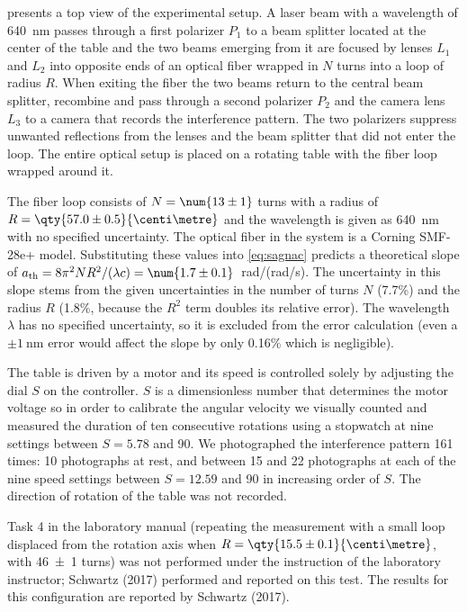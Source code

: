  presents a top view of the experimental setup. A laser beam with a wavelength of \qty{640}{\nano\metre} passes through a first polarizer $P_1$ to a beam splitter located at the center of the table and the two beams emerging from it are focused by lenses $L_1$ and $L_2$ into opposite ends of an optical fiber wrapped in $N$ turns into a loop of radius $R$. When exiting the fiber the two beams return to the central beam splitter, recombine and pass through a second polarizer $P_2$ and the camera lens $L_3$ to a camera that records the interference pattern.
The two polarizers suppress unwanted reflections from the lenses and the beam splitter that did not enter the loop. The entire optical setup is placed on a rotating table with the fiber loop wrapped around it.

The fiber loop consists of $N = \num{13 \pm 1}$ turns with a radius of $R = \qty{57.0 \pm 0.5}{\centi\metre}$ and the wavelength is given as \qty{640}{\nano\metre} with no specified uncertainty. The optical fiber in the system is a Corning SMF-28e+ model. Substituting these values into \cref{eq:sagnac} predicts a theoretical slope of $a_\mathrm{th} = 8\pi^2 N R^2/(\lambda c) = \num{1.7 \pm 0.1}$~rad/(rad/s).
The uncertainty in this slope stems from the given uncertainties in the number of turns $N$ (7.7\%) and the radius $R$ (1.8\%, because the $R^2$ term doubles its relative error). The wavelength $\lambda$ has no specified uncertainty, so it is excluded from the error calculation (even a $\pm\qty{1}{\nano\metre}$ error would affect the slope by only 0.16\% which is negligible).

The table is driven by a motor and its speed is controlled solely by adjusting the dial $S$ on the controller. $S$ is a dimensionless number that determines the motor voltage so in order to calibrate the angular velocity we visually counted and measured the duration of ten consecutive rotations using a stopwatch at nine settings between $S = 5.78$ and 90. We photographed the interference pattern 161 times: 10 photographs at rest, and between 15 and 22 photographs at each of the nine speed settings between $S = 12.59$ and 90 in increasing order of $S$. The direction of rotation of the table was not recorded.

Task 4 in the laboratory manual (repeating the measurement with a small loop displaced from the rotation axis when $R = \qty{15.5 \pm 0.1}{\centi\metre}$, with \num{46 \pm 1} turns) was not performed under the instruction of the laboratory instructor; Schwartz (2017) performed and reported on this test. The results for this configuration are reported by Schwartz (2017).
